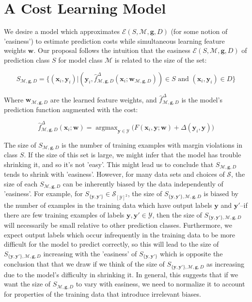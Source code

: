 \documentclass{article} %
\DeclareMathOperator*{\argmax}{argmax}
\begin{document}
\section{A Cost Learning Model}

We desire a model which approximates 
$\mathcal{E}(S,\mathcal{M},\mathbf{g}, D)$ (for some notion of 
'easiness') to estimate prediction costs while simultaneous learning 
feature weights $\mathbf{w}$.   Our proposal follows the intuition 
that the easiness 
$\mathcal{E}(S,\mathcal{M},\mathbf{g},D)$ of prediction class $S$ for 
model class $\mathcal{M}$ is related to the size of the set:

\begin{equation}
S_{\mathcal{M},\mathbf{g},D}=\{(\textbf{x}_i,\textbf{y}_i) | (\mathbf{y}_i,\hat{f}^\Delta_{\mathcal{M},\mathbf{g},D}(\mathbf{x}_i;\mathbf{w}_{\mathcal{M},\mathbf{g},D}))\in S\text{ and }(\mathbf{x}_i,\mathbf{y}_i)\in D\}
\end{equation}

Where $\mathbf{w}_{\mathcal{M},\mathbf{g},D}$ are the learned feature weights,
and $\hat{f}^\Delta_{\mathcal{M},\mathbf{g},D}$ is the model's prediction
function augmented with the cost:

\begin{equation}
\hat{f}^\Delta_{\mathcal{M},\mathbf{g},D}(\mathbf{x}_i;\mathbf{w})=\argmax_{\mathbf{y}\in\mathcal{Y}}\Big( F(\mathbf{x}_i,\mathbf{y};\mathbf{w})
+\Delta(\mathbf{y}_i,\mathbf{y})\Big)
\end{equation}

The size of $S_{\mathcal{M},\mathbf{g},D}$ is the number of
training examples with margin violations in class $S$. If
the size of this set is large, we might infer that the
model has trouble shrinking it, and so it's not 'easy'.  This 
might lead us to conclude that $S_{\mathcal{M},\mathbf{g},D}$ 
tends to shrink with 'easiness'.  However,
for many data sets and choices of $\mathcal{S}$, the size 
of each $S_{\mathcal{M},\mathbf{g},D}$ can be inherently
biased by the data independently of 'easiness'.  For example, 
for $S_{\{\mathbf{y},\mathbf{y}'\}}\in\mathcal{S}_{[\mathcal{Y}]^2}$, 
the size of $S_{\{\mathbf{y},\mathbf{y}'\},\mathcal{M},\mathbf{g},D}$ 
is biased by the number of examples in the training data which have 
output labels $\mathbf{y}$ and $\mathbf{y}'$--if there are few 
training examples of labels 
$\mathbf{y},\mathbf{y}'\in\mathcal{Y}$, then the size of 
$S_{\{\mathbf{y}, \mathbf{y}'\},\mathcal{M},\mathbf{g},D}$ 
will necessarily be small relative to other prediction classes.
Furthermore, we expect 
output labels which occur infrequently in the training data to 
be more difficult for the model to predict correctly, so this
will lead to the size of 
$S_{\{\mathbf{y},\mathbf{y}'\},\mathcal{M},\mathbf{g},D}$ 
increasing with the 'easiness' of 
$S_{\{\mathbf{y},\mathbf{y}'\}}$ which is opposite the 
conclusion that that we draw if we think of the size of 
$S_{\{\mathbf{y},\mathbf{y}'\},\mathcal{M},\mathbf{g},D}$ as
increasing due to the model's difficulty in shrinking it.  In general, 
this suggests that if we want the size of $S_{\mathcal{M},\mathbf{g},D}$
to vary with easiness, we need to normalize it to account for 
properties of the training data that introduce irrelevant
biases.  
\end{document}
